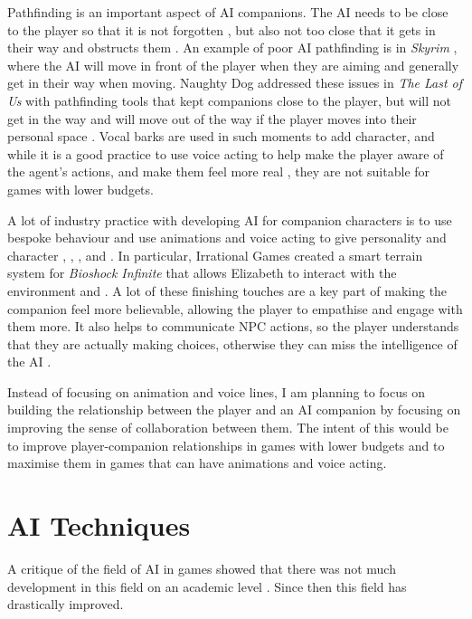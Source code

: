 \documentclass{IEEEtran}
\begin{document}
Pathfinding is an important aspect of AI companions. The AI needs to be close to the player so that it is not forgotten \cite{GAIP2EllieAI}, but also not too close that it gets in their way and obstructs them \cite{CoupledEmpowermentMaximisation}. An example of poor AI pathfinding is in \textit{Skyrim} \cite{tremblay2013adaptive}, where the AI will move in front of the player when they are aiming and generally get in their way when moving. Naughty Dog addressed these issues in \textit{The Last of Us} with pathfinding tools that kept companions close to the player, but will not get in the way and will move out of the way if the player moves into their personal space \cite{GAIP2EllieAI}. Vocal barks are used in such moments to add character, and while it is a good practice to use voice acting to help make the player aware of the agent’s actions, and make them feel more real \cite{GMTGoodAI}, they are not suitable for games with lower budgets.

A lot of industry practice with developing AI for companion characters is to use bespoke behaviour and use animations and voice acting to give personality and character \cite{GAIP2EllieAI}, \cite{GAIPOReactions}, \cite{GMTGoodAI}, \cite{AIGamesBioshockAI} and \cite{GDCElizabeth}. In particular, Irrational Games created a smart terrain system for \textit{Bioshock Infinite} that allows Elizabeth to interact with the environment \cite{AIGamesBioshockAI} and \cite{GDCElizabeth}. A lot of these finishing touches are a key part of making the companion feel more believable, allowing the player to empathise and engage with them more. It also helps to communicate NPC actions, so the player understands that they are actually making choices, otherwise they can miss the intelligence of the AI \cite{GMTGoodAI}.

Instead of focusing on animation and voice lines, I am planning to focus on building the relationship between the player and an AI companion by focusing on improving the sense of collaboration between them. The intent of this would be to improve player-companion relationships in games with lower budgets and to maximise them in games that can have animations and voice acting.

\section{AI Techniques}
\label{AITechniques}

A critique of the field of AI in games showed that there was not much development in this field on an academic level \cite{RealTimeAICritique2010}. Since then this field has drastically improved.
\end{document}
